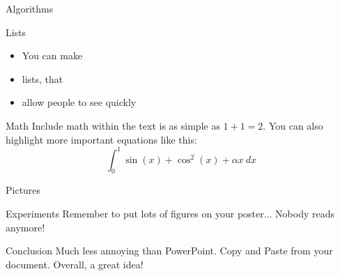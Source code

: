 \documentclass[serif,mathserif,final]{beamer}
\begin{document}
\begin{frame}{}
\begin{columns}[t]
\begin{column}{0.49\linewidth}
\begin{block}{Algorithms}
      \end{block}

      \begin{block}{Lists}
        \begin{itemize}
          \item You can make
          \item lists, that
          \item allow people to see quickly
        \end{itemize}
      \end{block}

      \begin{block}{Math}
        Include math within the text is as simple as $1+1=2$.  You can also
        highlight more important equations like this:
        \begin{equation*}
          \int_0^1\sin(x)+\cos^2(x)+\alpha x~d\!x
        \end{equation*}
      \end{block}


      \begin{block}{Pictures}
        \begin{figure}[htb]
          \centering
        \end{figure}
      \end{block}

      \begin{block}{Experiments}
        Remember to put lots of figures on your poster... Nobody reads anymore!
      \end{block}

      \begin{block}{Conclusion}
        Much less annoying than PowerPoint.  Copy and Paste from your
        document. Overall, a great idea!
      \end{block}

    \end{column}%

% 

  \end{columns}
\end{frame}
\end{document}

